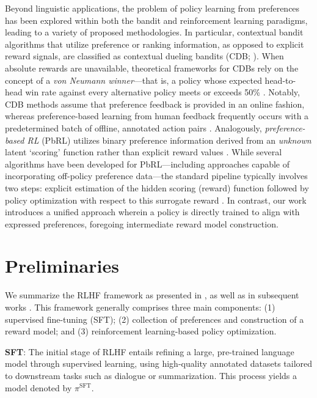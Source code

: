 Beyond linguistic applications, the problem of policy learning from preferences has been explored within both the bandit and reinforcement learning paradigms, leading to a variety of proposed methodologies. In particular, contextual bandit algorithms that utilize preference or ranking information, as opposed to explicit reward signals, are classified as contextual dueling bandits (CDB; \cite{yue2012karmed,dudik2015contextual}). When absolute rewards are unavailable, theoretical frameworks for CDBs rely on the concept of a \textit{von Neumann winner}—that is, a policy whose expected head-to-head win rate against every alternative policy meets or exceeds 50\% \citep{dudik2015contextual}. Notably, CDB methods assume that preference feedback is provided in an online fashion, whereas preference-based learning from human feedback frequently occurs with a predetermined batch of offline, annotated action pairs \citep{yan2022human}. Analogously, \textit{preference-based RL} (PbRL) utilizes binary preference information derived from an \textit{unknown} latent ‘scoring’ function rather than explicit reward values \citep{BusaFekete2014,ruiz2023dueling}. While several algorithms have been developed for PbRL—including approaches capable of incorporating off-policy preference data—the standard pipeline typically involves two steps: explicit estimation of the hidden scoring (reward) function followed by policy optimization with respect to this surrogate reward \citep{jain2013learning,BusaFekete2014,christiano2017deep,sadigh2017active,kupcsik2018learning}. In contrast, our work introduces a unified approach wherein a policy is directly trained to align with expressed preferences, foregoing intermediate reward model construction.

\section{Preliminaries}\label{section:prelims}

We summarize the RLHF framework as presented in \citeauthor{ziegler2020finetuning}, as well as in subsequent works \citep{stiennon2022learning, bai2022training, ouyang2022training}. This framework generally comprises three main components: (1) supervised fine-tuning (SFT); (2) collection of preferences and construction of a reward model; and (3) reinforcement learning-based policy optimization.

\textbf{SFT}: The initial stage of RLHF entails refining a large, pre-trained language model through supervised learning, using high-quality annotated datasets tailored to downstream tasks such as dialogue or summarization. This process yields a model denoted by $\pi^\text{SFT}$.

